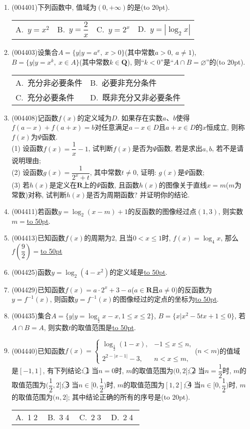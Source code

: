 \documentclass[10pt,a4paper]{article}
\newcommand{\blank}[1]{\underline{\hbox to #1pt{}}}
\newcommand{\bracket}[1]{(\hbox to #1pt{})}
\newcommand{\twoch}[4]{\par\begin{tabular}{p{.46\textwidth}p{.46\textwidth}}
A.~#1& B.~#2\\
C.~#3& D.~#4
\end{tabular}}
\newcommand{\fourch}[4]{\par\begin{tabular}{p{.23\textwidth}p{.23\textwidth}p{.23\textwidth}p{.23\textwidth}}
A.~#1 &B.~#2& C.~#3& D.~#4
\end{tabular}}
\begin{document}
\begin{enumerate}[1.]
\item {\tiny (004401)}下列函数中, 值域为$(0,+\infty)$的是\bracket{20}.
\fourch{$y=x^2$}{$y=\dfrac 2x$}{$y=2^x$}{$y=|\log_2x|$}
\item {\tiny (004403)}设集合$A=\{y|y=a^x,\ x>0\}$(其中常数$a>0,  \ a\ne 1$), $B=\{y|y=x^k,\ x\in A\}$(其中常数$k\in \mathbf{Q}$), 则``$k<0$''是``$A\cap B=\varnothing$''的\bracket{20}.
\twoch{充分非必要条件}{必要非充分条件}{充分必要条件}{既非充分又非必要条件}
\item {\tiny (004408)}记函数$f(x)$的定义域为$D$. 如果存在实数$a$、$b$使得$f(a-x)+f(a+x)=b$对任意满足$a-x\in D$且$a+x\in D$的$x$恒成立, 则称$f(x)$为$\Psi$函数.\\
(1) 设函数$f(x)=\dfrac 1x-1$, 试判断$f(x)$是否为$\Psi$函数, 若是求出$a,b$, 若不是请说明理由;\\
(2) 设函数$g(x)=\dfrac 1{2^x+t}$, 其中常数$t\ne 0$, 证明: $g(x)$是$\Psi$函数;\\
(3) 若$h(x)$是定义在$\mathbf{R}$上的$\Psi$函数, 且函数$h(x)$的图像关于直线$x=m$($m$为常数)对称, 试判断$h(x)$是否为周期函数? 并证明你的结论.
\item {\tiny (004411)}若函数$y=\log_2(x-m)+1$的反函数的图像经过点$(1,3)$, 则实数$m=$\blank{50}.
\item {\tiny (004413)}已知函数$f(x)$的周期为$2$, 且当$0<x\le 1$时, $f(x)=\log_4x$, 那么$f(\dfrac 92)=$\blank{50}
\item {\tiny (004425)}函数$y=\log_2(4-x^2)$的定义域是\blank{50}.
\item {\tiny (004429)}已知函数$f(x)=a\cdot 2^x+3-a$($a\in \mathbf{R}$且$a\ne 0$)的反函数为$y=f^{-1}(x)$, 则函数$y=f^{-1}(x)$的图像经过的定点的坐标为\blank{50}.
\item {\tiny (004435)}集合$A=\{y|y=\log_{\frac 12}x-x,1\le x\le 2\}$, $B=\{x|x^2-5tx+1\le 0\}$, 若$A\cap B=A$, 则实数$t$的取值范围是\blank{50}.
\item {\tiny (004440)}已知函数$f(x)=\begin{cases}\log_{\frac 12}(1-x), & -1\le x\le n,  \\ 2^{2-|x-1|}-3, & n<x\le m,  \end{cases}$($n<m$)的值域是$[-1,1]$, 有下列结论:
\textcircled{1} 当$n=0$时, $m$的取值范围为$(0,2]$; \textcircled{2}  当$n=\dfrac 12$时, $m$的取值范围为$(\dfrac 12,2]$; \textcircled{3}  当$n\in [0,\dfrac 12)$时, $m$的取值范围为$[1,2]$; \textcircled{4}  当$n\in [0,\dfrac 12)$时, $m$的取值范围为$(n,2]$;
其中结论正确的所有的序号是\bracket{20}.
\fourch{\textcircled{1}\textcircled{2}}{\textcircled{3}\textcircled{4}}{\textcircled{2}\textcircled{3}}{\textcircled{2}\textcircled{4}}

\end{enumerate}
\end{document}
